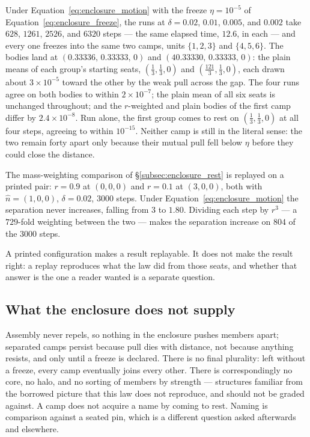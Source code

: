 \documentclass[12pt, a4paper]{article}
\begin{document}
Under Equation~\eqref{eq:enclosure_motion} with the freeze
$\eta=10^{-5}$ of Equation~\eqref{eq:enclosure_freeze}, the runs at
$\delta=0.02$, $0.01$, $0.005$, and $0.002$ take $628$, $1261$,
$2526$, and $6320$ steps --- the same elapsed time, $12.6$, in each
--- and every one freezes into the same two camps, units $\{1,2,3\}$
and $\{4,5,6\}$. The bodies land at
$(0.33336,\,0.33333,\,0)$ and $(40.33330,\,0.33333,\,0)$: the plain
means of each group's starting seats, $(\tfrac13,\tfrac13,0)$ and
$(\tfrac{121}{3},\tfrac13,0)$, each drawn about $3\times10^{-5}$
toward the other by the weak pull across the gap. The four runs agree
on both bodies to within $2\times10^{-7}$; the plain mean of all six
seats is unchanged throughout; and the $r$-weighted and plain bodies
of the first camp differ by $2.4\times10^{-8}$. Run alone, the first
group comes to rest on $(\tfrac13,\tfrac13,0)$ at all four steps,
agreeing to within $10^{-15}$. Neither camp is still in the
literal sense: the two remain forty apart only because their mutual
pull fell below $\eta$ before they could close the distance.

The mass-weighting comparison of \S\ref{subsec:enclosure_rest} is
replayed on a printed pair: $r=0.9$ at $(0,0,0)$ and $r=0.1$ at
$(3,0,0)$, both with $\hat n=(1,0,0)$, $\delta=0.02$, $3000$ steps.
Under Equation~\eqref{eq:enclosure_motion} the separation never
increases, falling from $3$ to $1.80$. Dividing each step by $r^3$ ---
a $729$-fold weighting between the two --- makes the separation
increase on $804$ of the $3000$ steps.

A printed configuration makes a result replayable. It does not make
the result right: a replay reproduces what the law did from those
seats, and whether that answer is the one a reader wanted is a
separate question.

\subsection{What the enclosure does not supply}
\label{subsec:enclosure_open}
Assembly never repels, so nothing in the enclosure pushes members
apart; separated camps persist because pull dies with distance, not
because anything resists, and only until a freeze is declared. There
is no final plurality: left without a freeze, every camp eventually
joins every other. There is correspondingly no core, no halo,
and no sorting of members by strength --- structures familiar from
the borrowed picture that this law does not reproduce, and should not
be graded against. A camp does not acquire a name by coming to rest.
Naming is comparison against a seated pin, which is a different
question asked afterwards and elsewhere.
\end{document}
